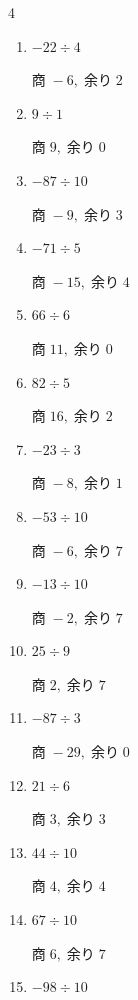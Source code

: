 \begin{multicols}{4}
\begin{enumerate}
  \item $-22 \div 4$

        $商\; -6,\; 余り\; 2$

  \item $9 \div 1$

        $商\; 9,\; 余り\; 0$

  \item $-87 \div 10$

        $商\; -9,\; 余り\; 3$

  \item $-71 \div 5$

        $商\; -15,\; 余り\; 4$

\columnbreak %

\resetques

  \item $66 \div 6$

        $商\; 11,\; 余り\; 0$

  \item $82 \div 5$

        $商\; 16,\; 余り\; 2$

  \item $-23 \div 3$

        $商\; -8,\; 余り\; 1$

  \item $-53 \div 10$

        $商\; -6,\; 余り\; 7$

  \item $-13 \div 10$

        $商\; -2,\; 余り\; 7$

  \item $25 \div 9$

        $商\; 2,\; 余り\; 7$

  \item $-87 \div 3$

        $商\; -29,\; 余り\; 0$

  \item $21 \div 6$

        $商\; 3,\; 余り\; 3$

  \item $44 \div 10$

        $商\; 4,\; 余り\; 4$

  \item $67 \div 10$

        $商\; 6,\; 余り\; 7$

  \item $-98 \div 10$


\end{enumerate}
\end{multicols}
